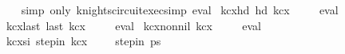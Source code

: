\begin{isabellebody}
%
\isadelimproof
\ \ %
\endisadelimproof
%
\isatagproof
{}\isamarkupfalse%
\ {\isacharparenleft}{\kern0pt}simp\ only{\isacharcolon}{\kern0pt}\ knights{\isacharunderscore}{\kern0pt}circuit{\isacharunderscore}{\kern0pt}exec{\isacharunderscore}{\kern0pt}simp{\isacharparenright}{\kern0pt}\ eval%
\endisatagproof
{\isafoldproof}%
%
\isadelimproof
\isanewline
%
\endisadelimproof
\isanewline
{}\isamarkupfalse%
\ kc{\isacharunderscore}{\kern0pt}{}x{}{\isacharunderscore}{\kern0pt}hd{\isacharcolon}{\kern0pt}\ {\isachardoublequoteopen}hd\ kc{}x{}\ {\isacharequal}{\kern0pt}\ {\isacharparenleft}{\kern0pt}{}{\isacharcomma}{\kern0pt}{}{\isacharparenright}{\kern0pt}{\isachardoublequoteclose}%
\isadelimproof
\ %
\endisadelimproof
%
\isatagproof
{}\isamarkupfalse%
\ eval%
\endisatagproof
{\isafoldproof}%
%
\isadelimproof
%
\endisadelimproof
\isanewline
\isanewline
{}\isamarkupfalse%
\ kc{\isacharunderscore}{\kern0pt}{}x{}{\isacharunderscore}{\kern0pt}last{\isacharcolon}{\kern0pt}\ {\isachardoublequoteopen}last\ kc{}x{}\ {\isacharequal}{\kern0pt}\ {\isacharparenleft}{\kern0pt}{}{\isacharcomma}{\kern0pt}{}{\isacharparenright}{\kern0pt}{\isachardoublequoteclose}%
\isadelimproof
\ %
\endisadelimproof
%
\isatagproof
{}\isamarkupfalse%
\ eval%
\endisatagproof
{\isafoldproof}%
%
\isadelimproof
%
\endisadelimproof
\isanewline
\isanewline
{}\isamarkupfalse%
\ kc{\isacharunderscore}{\kern0pt}{}x{}{\isacharunderscore}{\kern0pt}non{\isacharunderscore}{\kern0pt}nil{\isacharcolon}{\kern0pt}\ {\isachardoublequoteopen}kc{}x{}\ {\isasymnoteq}\ {\isacharbrackleft}{\kern0pt}{\isacharbrackright}{\kern0pt}{\isachardoublequoteclose}%
\isadelimproof
\ %
\endisadelimproof
%
\isatagproof
{}\isamarkupfalse%
\ eval%
\endisatagproof
{\isafoldproof}%
%
\isadelimproof
%
\endisadelimproof
\isanewline
\isanewline
{}\isamarkupfalse%
\ kc{\isacharunderscore}{\kern0pt}{}x{}{\isacharunderscore}{\kern0pt}si{\isacharcolon}{\kern0pt}\ {\isachardoublequoteopen}step{\isacharunderscore}{\kern0pt}in\ kc{}x{}\ {\isacharparenleft}{\kern0pt}{}{\isacharcomma}{\kern0pt}{}{\isacharparenright}{\kern0pt}\ {\isacharparenleft}{\kern0pt}{}{\isacharcomma}{\kern0pt}{}{\isacharparenright}{\kern0pt}{\isachardoublequoteclose}\ \ {\isacharparenleft}{\kern0pt}\ {\isachardoublequoteopen}step{\isacharunderscore}{\kern0pt}in\ {\isacharquery}{\kern0pt}ps\ {\isacharunderscore}{\kern0pt}\ {\isacharunderscore}{\kern0pt}{\isachardoublequoteclose}{\isacharparenright}{\kern0pt}\isanewline

\end{isabellebody}

